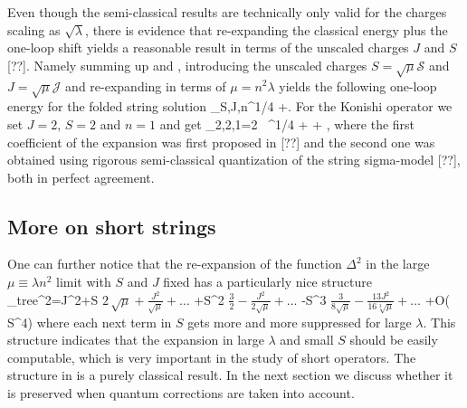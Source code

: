 Even though the semi-classical results are technically only valid for the charges scaling as $\sqrt{\lambda}$, there is evidence that re-expanding the classical energy plus the one-loop shift yields a reasonable result in terms of the unscaled charges $J$ and $S$ [??].
Namely summing up  and , introducing the unscaled charges $S = \sqrt{\mu} \mathcal{S}$ and $J = \sqrt{\mu} \mathcal{J}$ and re-expanding in terms of $\mu = n^2 \lambda$ yields the following one-loop energy for the folded string solution
\beq
\Delta_{S,J,n}\simeq{}\mu^{1/4}
+.
\eeq
For the Konishi operator we set $J=2$, $S=2$ and $n=1$ and get 
\beq
\Delta_{2,2,1}=2 \, \lambda^{1/4} + + ,
\eeq
where the first coefficient of the expansion was first proposed in [??] and the second one was obtained using rigorous semi-classical quantization of the string sigma-model [??], both in perfect agreement.

\subsection{More on short strings}

One can further notice \cite{Basso:2011rs} that the re-expansion of the function $\Delta^2$ in the large $\mu\equiv \lambda n^2$ limit with $S$ and $J$ fixed has a particularly nice structure
\beq
\Delta_{\rm tree}^2\!\!\!=\!J^2+S
\(
2\, \sqrt{\mu}+\frac{J^2}{\sqrt{\mu}}+\dots%
\)
+S^2
\(
\frac{3}{2}-\frac{J^2}{2\sqrt{\mu}}
+\dots%
\)
-S^3
\(
\frac{3}{8\sqrt{\mu}}
-\frac{13 J^2}{16\sqrt[3]{\mu}}
+\dots
\)
+{\cal O}({ S}^4)
\label{dsquare_tree}
\eeq
where each next term in $S$
gets more and more suppressed for large $\lambda$.
This structure indicates that the expansion in large $\lambda$
and small $S$ should be easily computable, which is very important in the study of short operators. 
The structure in  is a purely classical result. In the next section we discuss whether it is preserved when quantum corrections are taken into account.



